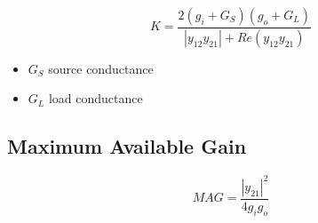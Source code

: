 \begin{equation}
K = \dfrac{2(g_i+G_S)(g_o+G_L)}{|y_{12}y_{21}|+Re(y_{12}y_{21})}
\end{equation}

\begin{itemize}
	\item $G_S$ source conductance
	\item $G_L$ load conductance
\end{itemize}

\subsection{Maximum Available Gain}

\begin{equation}
MAG = \dfrac{|y_{21}|^2}{4g_ig_o}
\end{equation}